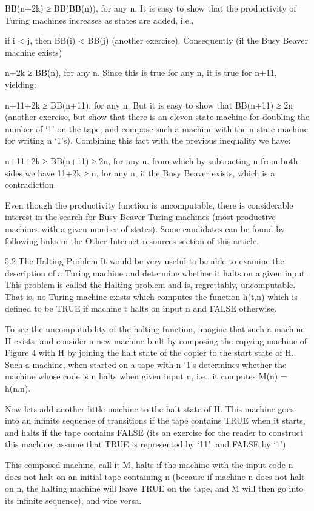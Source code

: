 BB(n+2k) ≥ BB(BB(n)), for any n.
It is easy to show that the productivity of Turing machines increases as states are added, i.e.,

if i < j, then BB(i) < BB(j)
(another exercise). Consequently (if the Busy Beaver machine exists)

n+2k ≥  BB(n), for any n.
Since this is true for any n, it is true for n+11, yielding:

n+11+2k ≥ BB(n+11), for any n.
But it is easy to show that BB(n+11) ≥ 2n (another exercise, but show that there is an eleven state machine for doubling the number of ‘1’ on the tape, and compose such a machine with the n-state machine for writing n ‘1’s). Combining this fact with the previous inequality we have:

n+11+2k ≥  BB(n+11) ≥ 2n, for any n.
from which by subtracting n from both sides we have 11+2k ≥ n, for any n, if the Busy Beaver exists, which is a contradiction.

Even though the productivity function is uncomputable, there is considerable interest in the search for Busy Beaver Turing machines (most productive machines with a given number of states). Some candidates can be found by following links in the Other Internet resources section of this article.

5.2 The Halting Problem
It would be very useful to be able to examine the description of a Turing machine and determine whether it halts on a given input. This problem is called the Halting problem and is, regrettably, uncomputable. That is, no Turing machine exists which computes the function h(t,n) which is defined to be TRUE if machine t halts on input n and FALSE otherwise.

To see the uncomputability of the halting function, imagine that such a machine H exists, and consider a new machine built by composing the copying machine of Figure 4 with H by joining the halt state of the copier to the start state of H. Such a machine, when started on a tape with n ‘1’s determines whether the machine whose code is n halts when given input n, i.e., it computes M(n) = h(n,n).

Now lets add another little machine to the halt state of H. This machine goes into an infinite sequence of transitions if the tape contains TRUE when it starts, and halts if the tape contains FALSE (its an exercise for the reader to construct this machine, assume that TRUE is represented by ‘11’, and FALSE by ‘1’).

This composed machine, call it M, halts if the machine with the input code n does not halt on an initial tape containing n (because if machine n does not halt on n, the halting machine will leave TRUE on the tape, and M will then go into its infinite sequence), and vice versa.

